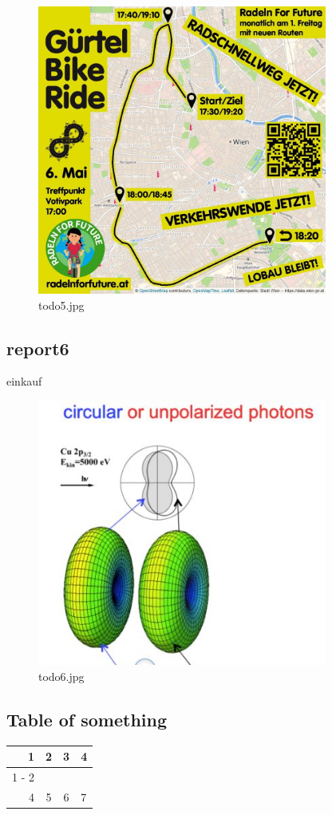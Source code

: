 \documentclass{article}%
\begin{document}
\begin{figure}[! htb]%
\centering%
\includegraphics[width=360px]{todo5.jpg}%
\caption{todo5.jpg}%
\end{figure}

%
\FloatBarrier

%
\subsection{report6}%
\label{subsec:report6}%
einkauf%


\begin{figure}[! htb]%
\centering%
\includegraphics[width=360px]{todo6.jpg}%
\caption{todo6.jpg}%
\end{figure}

%
\FloatBarrier

%
\subsection{Table of something}%
\label{subsec:Tableofsomething}%
\begin{tabular}{rc|cl}%
\hline%
1&2&3&4\\%
\cline{1%
-%
2}%
&&&\\%
4&5&6&7\\%
\end{tabular}
\end{document}
